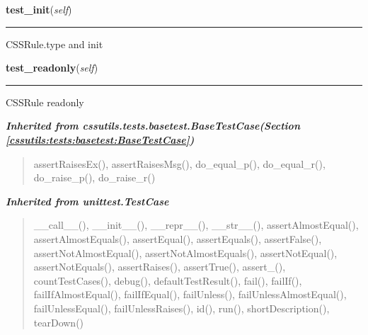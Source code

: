     \vspace{0.5ex}

\hspace{.8\funcindent}\begin{boxedminipage}{\funcwidth}

    \raggedright \textbf{test\_init}(\textit{self})

    \vspace{-1.5ex}

    \rule{\textwidth}{0.5\fboxrule}
\setlength{\parskip}{2ex}
    CSSRule.type and init

\setlength{\parskip}{1ex}
    \end{boxedminipage}

    \label{cssutils:tests:test_cssrule:CSSRuleTestCase:test_readonly}

    \vspace{0.5ex}

\hspace{.8\funcindent}\begin{boxedminipage}{\funcwidth}

    \raggedright \textbf{test\_readonly}(\textit{self})

    \vspace{-1.5ex}

    \rule{\textwidth}{0.5\fboxrule}
\setlength{\parskip}{2ex}
    CSSRule readonly

\setlength{\parskip}{1ex}
    \end{boxedminipage}


\large{\textbf{\textit{Inherited from cssutils.tests.basetest.BaseTestCase\textit{(Section \ref{cssutils:tests:basetest:BaseTestCase})}}}}

\begin{quote}
assertRaisesEx(), assertRaisesMsg(), do\_equal\_p(), do\_equal\_r(), do\_raise\_p(), do\_raise\_r()
\end{quote}

\large{\textbf{\textit{Inherited from unittest.TestCase}}}

\begin{quote}
\_\_call\_\_(), \_\_init\_\_(), \_\_repr\_\_(), \_\_str\_\_(), assertAlmostEqual(), assertAlmostEquals(), assertEqual(), assertEquals(), assertFalse(), assertNotAlmostEqual(), assertNotAlmostEquals(), assertNotEqual(), assertNotEquals(), assertRaises(), assertTrue(), assert\_(), countTestCases(), debug(), defaultTestResult(), fail(), failIf(), failIfAlmostEqual(), failIfEqual(), failUnless(), failUnlessAlmostEqual(), failUnlessEqual(), failUnlessRaises(), id(), run(), shortDescription(), tearDown()
\end{quote}

